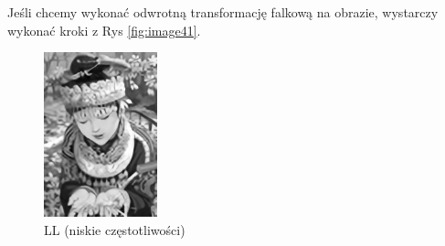 Jeśli chcemy wykonać odwrotną transformację falkową na obrazie, wystarczy wykonać kroki z Rys \ref{fig:image41}. 


\begin{figure}[ht]
    \centering
    \begin{minipage}[t]{0.35\linewidth}
        \includegraphics[width=\linewidth]{Rozdziały/02.Podstawy_teoretyczne/Obrazy/level_1_decomposition_LL.png}
        \caption{LL (niskie częstotliwości)}
        \label{fig:image42}
    \end{minipage}
    \centering
    \begin{minipage}[t]{0.35\linewidth}

\end{minipage}
\end{figure}
